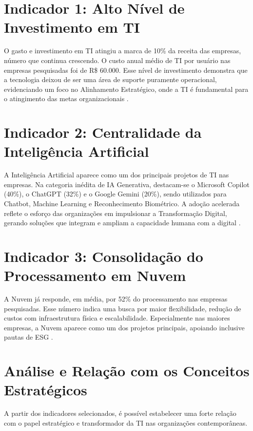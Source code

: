 \documentclass[12pt,a4paper,oneside]{article}
\begin{document}
\section{Indicador 1: Alto Nível de Investimento em TI}

O gasto e investimento em TI atingiu a marca de 10\% da receita das empresas, número que continua crescendo. O custo anual médio de TI por usuário nas empresas pesquisadas foi de R\$ 60.000. Esse nível de investimento demonstra que a tecnologia deixou de ser uma área de suporte puramente operacional, evidenciando um foco no Alinhamento Estratégico, onde a TI é fundamental para o atingimento das metas organizacionais \cite{rocha2018}.

\section{Indicador 2: Centralidade da Inteligência Artificial}

A Inteligência Artificial aparece como um dos principais projetos de TI nas empresas. Na categoria inédita de IA Generativa, destacam-se o Microsoft Copilot (40\%), o ChatGPT (32\%) e o Google Gemini (20\%), sendo utilizados para Chatbot, Machine Learning e Reconhecimento Biométrico. A adoção acelerada reflete o esforço das organizações em impulsionar a Transformação Digital, gerando soluções que integram e ampliam a capacidade humana com a digital \cite{kluyver2007}.

\section{Indicador 3: Consolidação do Processamento em Nuvem}

A Nuvem já responde, em média, por 52\% do processamento nas empresas pesquisadas. Esse número indica uma busca por maior flexibilidade, redução de custos com infraestrutura física e escalabilidade. Especialmente nas maiores empresas, a Nuvem aparece como um dos projetos principais, apoiando inclusive pautas de ESG \cite{fgvcia2025}.

\section{Análise e Relação com os Conceitos Estratégicos}

A partir dos indicadores selecionados, é possível estabelecer uma forte relação com o papel estratégico e transformador da TI nas organizações contemporâneas.
\end{document}
